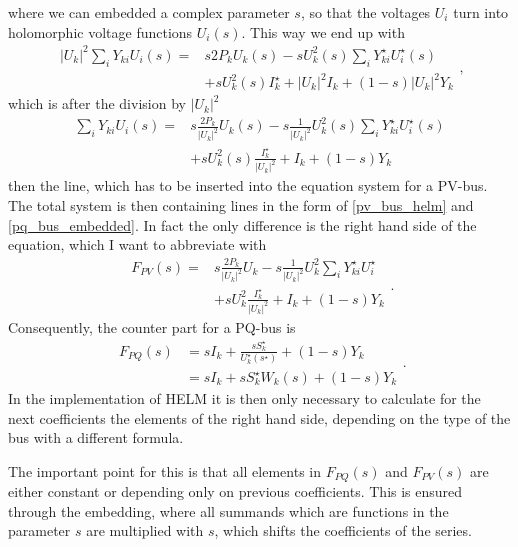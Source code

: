 where we can embedded a complex parameter $s$, so that the voltages $U_i$ turn into holomorphic voltage functions $U_i(s)$. This way we end up with
\begin{equation}
	\begin{split}
		|U_k|^2 \sum_i Y_{ki} U_i(s) = 
			& s 2 P_k U_k(s) - s U_k^2(s) \sum_i Y_{ki}^\star U_i^\star(s) \\
			& + s U_k^2(s) I_k^\star + |U_k|^2 I_k + (1 - s) |U_k|^2 Y_k
	\end{split},
\end{equation}
which is after the division by $|U_k|^2$
\begin{equation}
	\begin{split}
		\sum_i Y_{ki} U_i(s) = 
			& s \frac{2 P_k}{|U_k|^2} U_k(s) - s \frac{1}{|U_k|^2} U_k^2(s) \sum_i Y_{ki}^\star U_i^\star(s) \\
			& + s U_k^2(s) \frac{I_k^\star}{|U_k|^2} + I_k + (1 - s) Y_k
	\end{split}
	\label{eq:pv_bus_helm}
\end{equation}
then the line, which has to be inserted into the equation system for a PV-bus. The total system is then containing lines in the form of \eqref{pv_bus_helm} and \eqref{pq_bus_embedded}. In fact the only difference is the right hand side of the equation, which I want to abbreviate with
\begin{equation}
	\begin{split}
		F_{PV}(s) = 
			& s \frac{2 P_k}{|U_k|^2} U_k - s \frac{1}{|U_k|^2} U_k^2 \sum_i Y_{ki}^\star U_i^\star \\
			& + s U_k^2 \frac{I_k^\star}{|U_k|^2} + I_k + (1 - s) Y_k
	\end{split}.
	\label{eq:rhs_pv}
\end{equation}
Consequently, the counter part for a PQ-bus is
\begin{equation}
	\begin{split}
		F_{PQ}(s) 	& = s I_k + \frac{s S_k^\star}{U_k^\star(s^\star)} + (1 - s) Y_k \\
				& = s I_k + s S_k^\star W_k(s) + (1 - s) Y_k
	\end{split}.
	\label{eq:rhs_pq}
\end{equation}
In the implementation of HELM it is then only necessary to calculate for the next coefficients the elements of the right hand side, depending on the type of the bus with a different formula.

The important point for this is that all elements in $F_{PQ}(s)$ and $F_{PV}(s)$ are either constant or depending only on previous coefficients. This is ensured through the embedding, where all summands which are functions in the parameter $s$ are multiplied with $s$, which shifts the coefficients of the series.

